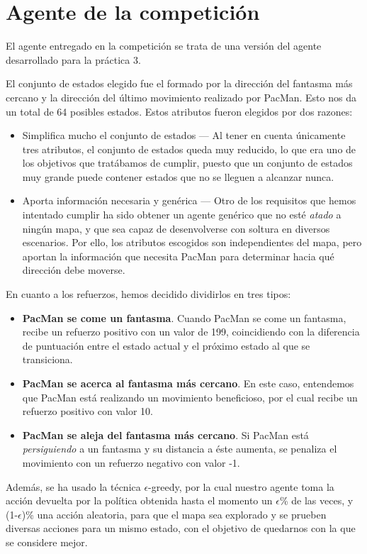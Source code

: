 \documentclass[12pt]{article}
\begin{document}
\tableofcontents

\newpage

\section{Agente de la competición}

El agente entregado en la competición se trata de una versión del agente desarrollado para la práctica 3.

El conjunto de estados elegido fue el formado por la dirección del fantasma más cercano y la dirección del último movimiento realizado por PacMan. Esto nos da un total de 64 posibles estados. Estos atributos fueron elegidos por dos razones:
\begin{itemize}
	\item Simplifica mucho el conjunto de estados — Al tener en cuenta únicamente tres atributos, el conjunto de estados queda muy reducido, lo que era uno de los objetivos que tratábamos de cumplir, puesto que un conjunto de estados muy grande puede contener estados que no se lleguen a alcanzar nunca.
	\item Aporta información necesaria y genérica — Otro de los requisitos que hemos intentado cumplir ha sido obtener un agente genérico que no esté \textit{atado} a ningún mapa, y que sea capaz de desenvolverse con soltura en diversos escenarios. Por ello, los atributos escogidos son independientes del mapa, pero aportan la información que necesita PacMan para determinar hacia qué dirección debe moverse.
\end{itemize}

En cuanto a los refuerzos, hemos decidido dividirlos en tres tipos:
\begin{itemize}
	\item \textbf{PacMan se come un fantasma}. Cuando PacMan se come un fantasma, recibe un refuerzo positivo con un valor de 199, coincidiendo con la diferencia de puntuación entre el estado actual y el próximo estado al que se transiciona.
	\item \textbf{PacMan se acerca al fantasma más cercano}. En este caso, entendemos que PacMan está realizando un movimiento beneficioso, por el cual recibe un refuerzo positivo con valor 10.
	\item \textbf{PacMan se aleja del fantasma más cercano}. Si PacMan está \textit{persiguiendo} a un fantasma y su distancia a éste aumenta, se penaliza el movimiento con un refuerzo negativo con valor -1.
\end{itemize}

Además, se ha usado la técnica $\epsilon$-greedy, por la cual nuestro agente toma la acción devuelta por la política obtenida hasta el momento un $\epsilon$\% de las veces, y (1-$\epsilon$)\% una acción aleatoria, para que el mapa sea explorado y se prueben diversas acciones para un mismo estado, con el objetivo de quedarnos con la que se considere mejor.
\end{document}
